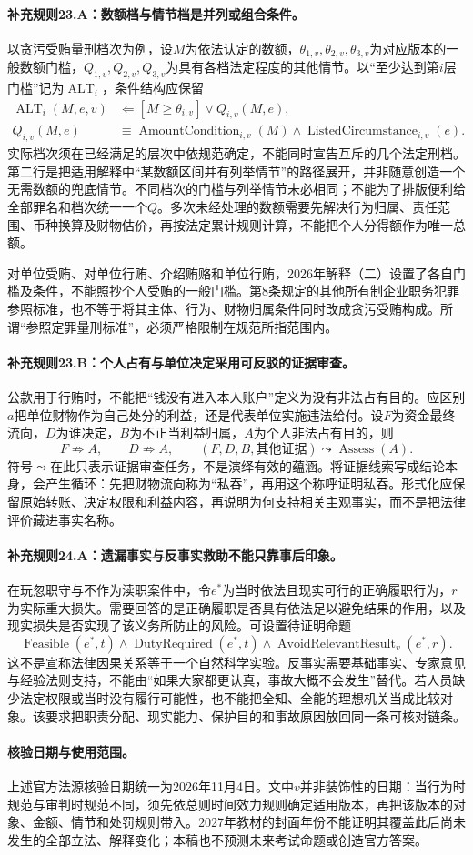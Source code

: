 \paragraph{补充规则23.A：数额档与情节档是并列或组合条件。}
以贪污受贿量刑档次为例，设$M$为依法认定的数额，$\theta_{1,v},\theta_{2,v},\theta_{3,v}$为对应版本的一般数额门槛，$Q_{1,v},Q_{2,v},Q_{3,v}$为具有各档法定程度的其他情节。以“至少达到第$i$层门槛”记为$\operatorname{ALT}_i$，条件结构应保留
\[
\begin{aligned}
\operatorname{ALT}_i(M,e,v)
&\Leftarrow [M\geq\theta_{i,v}]\lor Q_{i,v}(M,e),\\
Q_{i,v}(M,e)&\equiv\operatorname{AmountCondition}_{i,v}(M)
\land\operatorname{ListedCircumstance}_{i,v}(e).
\end{aligned}
\]
实际档次须在已经满足的层次中依规范确定，不能同时宣告互斥的几个法定刑档。第二行是把适用解释中“某数额区间并有列举情节”的路径展开，并非随意创造一个无需数额的兜底情节。不同档次的门槛与列举情节未必相同；不能为了排版便利给全部罪名和档次统一一个$Q$。多次未经处理的数额需要先解决行为归属、责任范围、币种换算及财物估价，再按法定累计规则计算，不能把个人分得额作为唯一总额。

对单位受贿、对单位行贿、介绍贿赂和单位行贿，2026年解释（二）设置了各自门槛及条件，不能照抄个人受贿的一般门槛。第8条规定的其他所有制企业职务犯罪参照标准，也不等于将其主体、行为、财物归属条件同时改成贪污受贿构成。所谓“参照定罪量刑标准”，必须严格限制在规范所指范围内。

\paragraph{补充规则23.B：个人占有与单位决定采用可反驳的证据审查。}
公款用于行贿时，不能把“钱没有进入本人账户”定义为没有非法占有目的。应区别$a$把单位财物作为自己处分的利益，还是代表单位实施违法给付。设$F$为资金最终流向，$D$为谁决定，$B$为不正当利益归属，$A$为个人非法占有目的，则
\[
F\nRightarrow A,\qquad D\nRightarrow A,\qquad
(F,D,B,\text{其他证据})\leadsto\operatorname{Assess}(A).
\]
符号$\leadsto$在此只表示证据审查任务，不是演绎有效的蕴涵。将证据线索写成结论本身，会产生循环：先把财物流向称为“私吞”，再用这个称呼证明私吞。形式化应保留原始转账、决定权限和利益内容，再说明为何支持相关主观事实，而不是把法律评价藏进事实名称。

\paragraph{补充规则24.A：遗漏事实与反事实救助不能只靠事后印象。}
在玩忽职守与不作为渎职案件中，令$e^*$为当时依法且现实可行的正确履职行为，$r$为实际重大损失。需要回答的是正确履职是否具有依法足以避免结果的作用，以及现实损失是否实现了该义务所防止的风险。可设置待证明命题
\[
\operatorname{Feasible}(e^*,t)\land\operatorname{DutyRequired}(e^*,t)
\land\operatorname{AvoidRelevantResult}_v(e^*,r).
\]
这不是宣称法律因果关系等于一个自然科学实验。反事实需要基础事实、专家意见与经验法则支持，不能由“如果大家都更认真，事故大概不会发生”替代。若人员缺少法定权限或当时没有履行可能性，也不能把全知、全能的理想机关当成比较对象。该要求把职责分配、现实能力、保护目的和事故原因放回同一条可核对链条。

\paragraph{核验日期与使用范围。}
上述官方法源核验日期统一为2026年11月4日。文中$v$并非装饰性的日期：当行为时规范与审判时规范不同，须先依总则时间效力规则确定适用版本，再把该版本的对象、金额、情节和处罚规则带入。2027年教材的封面年份不能证明其覆盖此后尚未发生的全部立法、解释变化；本稿也不预测未来考试命题或创造官方答案。
